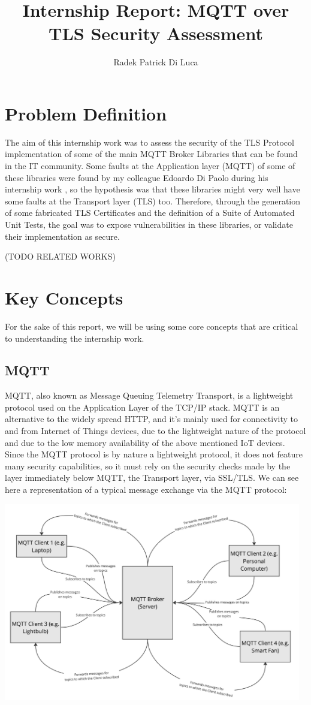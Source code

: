 \documentclass[binding=0.6cm,noexaminfo]{sapthesis}
\title{Internship Report: MQTT over TLS Security Assessment} \author{Radek Patrick Di Luca}
\begin{document}
\frontmatter
\maketitle
\tableofcontents
\mainmatter
\chapter{Problem Definition}
The aim of this internship work was to assess the security of the TLS Protocol implementation of some of the main MQTT Broker Libraries that can be found in the IT community. Some faults at the Application layer (MQTT) of some of these libraries were found by my colleague Edoardo Di Paolo during his internship work \cite{mqttpaper}, so the hypothesis was that these libraries might very well have some faults at the Transport layer (TLS) too.
Therefore, through the generation of some fabricated TLS Certificates and the definition of a Suite of Automated Unit Tests, the goal was to expose vulnerabilities in these libraries, or validate their implementation as secure.

\cite{mithys} \cite{sslvalidation} (TODO RELATED WORKS)

\chapter{Key Concepts}
For the sake of this report, we will be using some core concepts that are critical to understanding the internship work.

\section{MQTT}
MQTT, also known as Message Queuing Telemetry Transport, is a lightweight protocol used on the Application Layer of the TCP/IP stack. MQTT is an alternative to the widely spread HTTP, and it’s mainly used for connectivity to and from Internet of Things devices, due to the lightweight nature of the protocol and due to the low memory availability of the above mentioned IoT devices.
Since the MQTT protocol is by nature a lightweight protocol, it does not feature many security capabilities, so it must rely on the security checks made by the layer immediately below MQTT, the Transport layer, via SSL/TLS.
We can see here a representation of a typical message exchange via the MQTT protocol:

\includegraphics[width=13cm]{MQTT}
\end{document}
